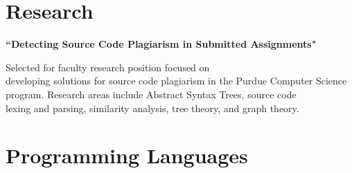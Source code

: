 \documentclass[
	10pt, %
]{FreemanCV}
\begin{document}
\begin{paracol}{2}

\section{Research}

{\raggedright\textbf{``Detecting Source Code Plagiarism in Submitted Assignments"}\par}

\medskip %

Selected for faculty research position focused on\\ developing solutions for source code plagiarism in the Purdue Computer Science program. Research areas include Abstract Syntax Trees, source code\\ lexing and parsing, similarity analysis, tree theory, and graph theory.

\medskip %


\section{Programming Languages}




\begin{supertabular}{r l} %


\end{supertabular}
\end{paracol}
\end{document}
